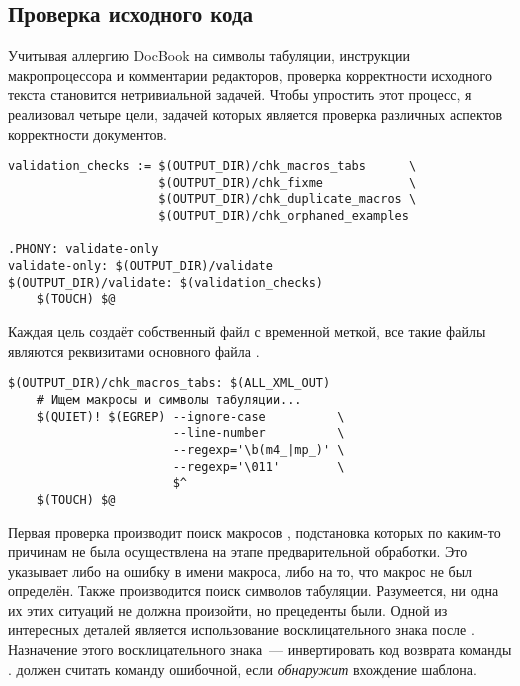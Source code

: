 \subsection{Проверка исходного кода}

Учитывая аллергию DocBook на символы табуляции, инструкции
макропроцессора и комментарии редакторов, проверка корректности
исходного текста становится нетривиальной задачей. Чтобы упростить
этот процесс, я реализовал четыре цели, задачей которых является
проверка различных аспектов корректности документов.

\begin{verbatim}
validation_checks := $(OUTPUT_DIR)/chk_macros_tabs      \
                     $(OUTPUT_DIR)/chk_fixme            \
                     $(OUTPUT_DIR)/chk_duplicate_macros \
                     $(OUTPUT_DIR)/chk_orphaned_examples

.PHONY: validate-only
validate-only: $(OUTPUT_DIR)/validate
$(OUTPUT_DIR)/validate: $(validation_checks)
    $(TOUCH) $@
\end{verbatim}

Каждая цель создаёт собственный файл с временной меткой, все такие
файлы являются реквизитами основного файла .

\begin{verbatim}
$(OUTPUT_DIR)/chk_macros_tabs: $(ALL_XML_OUT)
    # Ищем макросы и символы табуляции...
    $(QUIET)! $(EGREP) --ignore-case          \
                       --line-number          \
                       --regexp='\b(m4_|mp_)' \
                       --regexp='\011'        \
                       $^
    $(TOUCH) $@
\end{verbatim}

Первая проверка производит поиск макросов , подстановка
которых по каким-то причинам не была осуществлена на этапе
предварительной обработки. Это указывает либо на ошибку в имени
макроса, либо на то, что макрос не был определён. Также производится
поиск символов табуляции. Разумеется, ни одна их этих ситуаций не
должна произойти, но прецеденты были. Одной из интересных деталей
является использование восклицательного знака после
\command{\$(QUIET)}. Назначение этого восклицательного знака~---
инвертировать код возврата команды \utility{egrep}. \GNUmake{} должен
считать команду ошибочной, если \utility{egrep} \emph{обнаружит}
вхождение шаблона.

